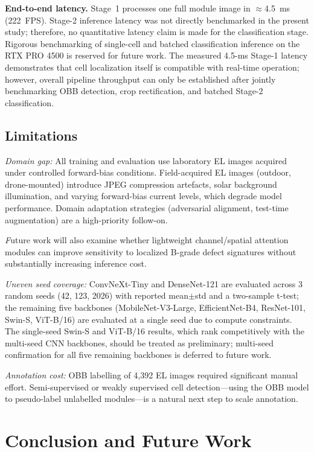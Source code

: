 \documentclass[conference]{IEEEtran}
\begin{document}
\textbf{End-to-end latency.} Stage~1 processes one full module image in $\approx$4.5~ms (222~FPS). Stage-2 inference latency was not directly benchmarked in the present study; therefore, no quantitative latency claim is made for the classification stage. Rigorous benchmarking of single-cell and batched classification inference on the RTX PRO 4500 is reserved for future work. The measured 4.5-ms Stage-1 latency demonstrates that cell localization itself is compatible with real-time operation; however, overall pipeline throughput can only be established after jointly benchmarking OBB detection, crop rectification, and batched Stage-2 classification.

\subsection{Limitations}

\textit{Domain gap:} All training and evaluation use laboratory EL images acquired under controlled forward-bias conditions. Field-acquired EL images (outdoor, drone-mounted) introduce JPEG compression artefacts, solar background illumination, and varying forward-bias current levels, which degrade model performance. Domain adaptation strategies (adversarial alignment, test-time augmentation) are a high-priority follow-on.

\textit Future work will also examine whether lightweight channel/spatial attention modules can improve sensitivity to localized B-grade defect signatures without substantially increasing inference cost.

\textit{Uneven seed coverage:} ConvNeXt-Tiny and DenseNet-121 are evaluated across 3 random seeds (42, 123, 2026) with reported mean$\pm$std and a two-sample t-test; the remaining five backbones (MobileNet-V3-Large, EfficientNet-B4, ResNet-101, Swin-S, ViT-B/16) are evaluated at a single seed due to compute constraints. The single-seed Swin-S and ViT-B/16 results, which rank competitively with the multi-seed CNN backbones, should be treated as preliminary; multi-seed confirmation for all five remaining backbones is deferred to future work.

\textit{Annotation cost:} OBB labelling of 4{,}392 EL images required significant manual effort. Semi-supervised or weakly supervised cell detection---using the OBB model to pseudo-label unlabelled modules---is a natural next step to scale annotation.

\section{Conclusion and Future Work}
\label{sec:conclusion}
\end{document}

